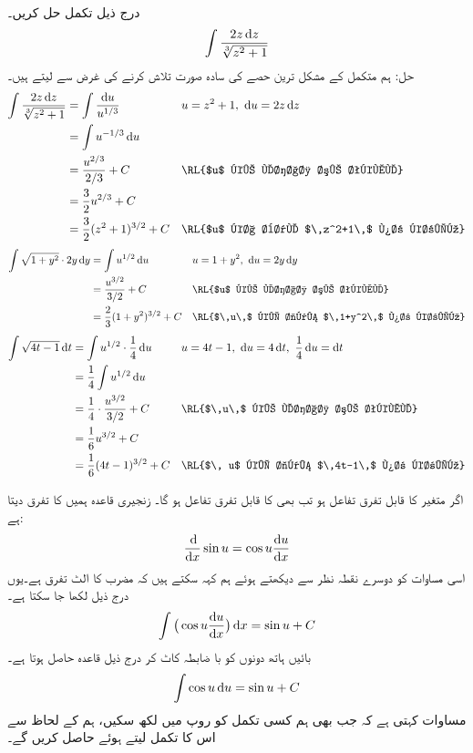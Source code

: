 درج ذیل تکمل حل کریں۔
\begin{align*}
\int\frac{2z\dif z}{\sqrt[3]{z^2+1}}
\end{align*}
حل:\quad
ہم متکمل کے مشکل ترین حصے کی سادہ صورت تلاش کرنے کی غرض سے   لیتے ہیں۔
\begin{align*}
\int\frac{2z\dif z}{\sqrt[3]{z^2+1}}&=\int\frac{\dif u}{u^{1/3}}&&u=z^2+1,\,\,\dif u=2z\dif z\\
&=\int u^{-1/3}\dif u\\
&=\frac{u^{2/3}}{2/3}+C&&\text{\RL{$u$ کے لحاظ سے تکمل}}\\
&=\frac{3}{2}u^{2/3}+C\\
&=\frac{3}{2}(z^2+1)^{3/2}+C&&\text{\RL{$u$ کا بدل $\,z^2+1\,$ پر کریں}}
\end{align*}
\begin{align*}
\int\sqrt{1+y^2}\cdot 2y\dif y&=\int u^{1/2}\dif u&&u=1+y^2,\,\, \dif u=2y\dif y\\
&=\frac{u^{3/2}}{3/2}+C&&\text{\RL{$u$ کے لحاظ سے تکمل}}\\
&=\frac{2}{3}(1+y^2)^{3/2}+C&&\text{\RL{$\,u\,$ کی جگہ $\,1+y^2\,$ پر کریں}}
\end{align*}
\begin{align*}
\int\sqrt{4t-1}\dif t&=\int u^{1/2}\cdot \frac{1}{4}\dif u&&u=4t-1,\,\,\dif u=4\dif t,\,\, \frac{1}{4}\dif u=\dif t\\
&=\frac{1}{4}\int u^{1/2}\dif u\\
&=\frac{1}{4}\cdot \frac{u^{3/2}}{3/2}+C&&\text{\RL{$\,u\,$ کے لحاظ سے تکمل}}\\
&=\frac{1}{6}u^{3/2}+C\\
&=\frac{1}{6}(4t-1)^{3/2}+C&&\text{\RL{$\, u$ کی جگہ $\,4t-1\,$ پر کریں}}
\end{align*}

اگر  متغیر  کا قابل تفرق تفاعل ہو تب  بھی  کا قابل تفرق تفاعل ہو گا۔ زنجیری قاعدہ ہمیں  کا تفرق دیتا ہے:
\begin{align*}
\frac{\dif}{\dif x}\sin u=\cos u\frac{\dif u}{\dif x}
\end{align*}
اسی مساوات کو دوسرے نقطہ نظر سے دیکھتے ہوئے ہم کہہ سکتے ہیں کہ  مضرب  کا الٹ تفرق ہے۔یوں درج ذیل لکھا جا سکتا ہے۔
\begin{align*}
\int\big(\cos u\frac{\dif u}{\dif x}\big)\dif x=\sin u+C
\end{align*}
بائیں ہاتھ دونوں  کو با ضابطہ کاٹ کر درج ذیل قاعدہ حاصل ہوتا ہے۔
  \begin{align}\label{مساوات_تکمل_کوسائن_قاعدہ}
\int\cos u\dif u=\sin u+C
\end{align}
مساوات  کہتی ہے کہ جب بھی ہم کسی تکمل کو  روپ میں لکھ سکیں، ہم  کے لحاظ سے اس کا تکمل لیتے ہوئے  حاصل کریں گے۔

